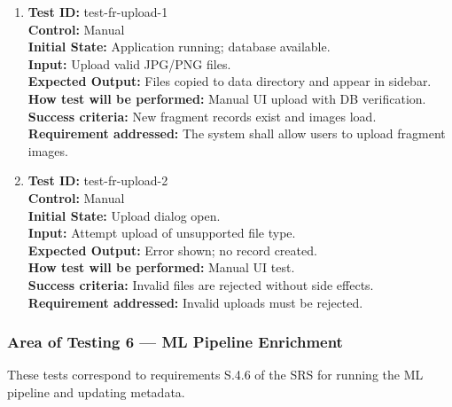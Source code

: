 \documentclass[12pt, titlepage]{article}
\begin{document}
\begin{enumerate}
    \item
    \textbf{Test ID:} test-fr-upload-1\\
    \textbf{Control:} Manual\\
    \textbf{Initial State:} Application running; database available.\\
    \textbf{Input:} Upload valid JPG/PNG files.\\
    \textbf{Expected Output:} Files copied to data directory and appear in sidebar.\\
    \textbf{How test will be performed:} Manual UI upload with DB verification.\\
    \textbf{Success criteria:} New fragment records exist and images load.\\
    \textbf{Requirement addressed:} The system shall allow users to upload fragment images.\\

    \item
    \textbf{Test ID:} test-fr-upload-2\\
    \textbf{Control:} Manual\\
    \textbf{Initial State:} Upload dialog open.\\
    \textbf{Input:} Attempt upload of unsupported file type.\\
    \textbf{Expected Output:} Error shown; no record created.\\
    \textbf{How test will be performed:} Manual UI test.\\
    \textbf{Success criteria:} Invalid files are rejected without side effects.\\
    \textbf{Requirement addressed:} Invalid uploads must be rejected.\\
\end{enumerate}

\subsubsection{Area of Testing 6 — ML Pipeline Enrichment}

These tests correspond to requirements S.4.6 of the SRS for running the ML pipeline and updating metadata.
\end{document}
